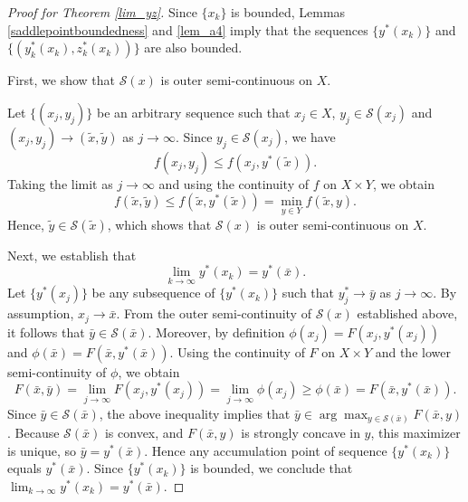 \documentclass[10pt,a4paper]{amsart}
\begin{document}
\begin{proof}[Proof for Theorem \ref{lim_yz}]
Since $\{x_k\}$ is bounded, Lemmas \ref{saddlepointboundedness} and \ref{lem_a4} imply that the sequences $\{y^*(x_k)\}$ and $\{(y_k^*(x_k),z_k^*(x_k))\}$ are also bounded.

First, we show that $\mathcal{S}(x)$ is outer semi-continuous on $X$. 

Let $\{(x_j, y_j)\}$ be an arbitrary sequence such that $x_j \in X$, $y_j \in \mathcal{S}(x_j)$ and $(x_j, y_j) \rightarrow (\tilde{x}, \tilde{y})$ as $j \rightarrow \infty$. Since $y_j \in \mathcal{S}(x_j)$, we have
\[
f(x_j,y_j) \le f(x_j,y^*(\tilde{x})).
\]
Taking the limit as $j \to \infty$ and using the continuity of $f$ on $X \times Y$, we obtain
\[
f(\tilde{x}, \tilde{y}) \le f(\tilde{x},y^*(\tilde{x})) = \min_{y \in Y} f(\tilde{x}, y).
\]
Hence, $\tilde{y} \in \mathcal{S}(\tilde{x})$, which shows that $\mathcal{S}(x)$ is outer semi-continuous on $X$.

Next, we establish that
\[
\lim_{k \to\infty}y^*(x_k)=y^*(\bar{x}).
\]    
Let $\{y^*(x_j)\}$ be any subsequence of $\{y^*(x_k)\}$ such that $y_j^* \rightarrow \bar{y}$ as $j \rightarrow \infty$. By assumption, $x_j \rightarrow \bar{x}$. From the outer semi-continuity of $\mathcal{S}(x)$ established above, it follows that $\bar{y} \in \mathcal{S}(\bar{x})$. Moreover, by definition $\phi(x_j) = F(x_j,y^*(x_j))$ and $\phi(\bar{x}) = F(\bar{x}, y^*(\bar{x}))$. Using the continuity of $F$ on $X \times Y$ and the lower semi-continuity of $\phi$, we obtain
\[
F(\bar{x},\bar{y})=\lim_{j\to\infty}F(x_{j},y^*(x_j))=\lim_{j\to\infty} \phi(x_{j})\ge \phi(\bar{x}) =F(\bar{x},y^*(\bar{x})).
\]
Since $\bar{y} \in \mathcal{S}(\bar{x})$, the above inequality implies that $\bar{y} \in \arg\max_{y\in\mathcal{S}(\bar{x})}F(\bar{x},y) $. Because $\mathcal{S}(\bar{x})$ is convex, and $F(\bar{x},y)$ is strongly concave in $y$, this maximizer is unique, so $\bar{y} = y^*(\bar{x})$. Hence any accumulation point of sequence $\{y^*(x_k)\}$ equals $y^*(\bar{x})$. Since $\{y^*(x_k)\}$ is bounded, we conclude that $\lim_{k \to\infty}y^*(x_k)=y^*(\bar{x})$.


\end{proof}
\end{document}

